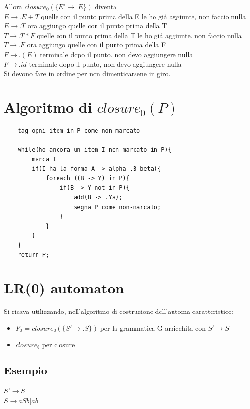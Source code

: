 Allora $closure_0(\{ E' \rightarrow .E \})$ diventa \\
$E \rightarrow .E + T $ quelle con il punto prima della E le ho gi\'a aggiunte, non faccio nulla\\
$E \rightarrow .T $ ora aggiungo quelle con il punto prima della T\\
$T \rightarrow .T * F $ quelle con il punto prima della T le ho gi\'a aggiunte, non faccio nulla\\
$T \rightarrow .F $ ora aggiungo quelle con il punto prima della F\\
$F \rightarrow .(E)$ terminale dopo il punto, non devo aggiungere nulla\\
$F \rightarrow .id$ terminale dopo il punto, non devo aggiungere nulla\\
Si devono fare in ordine per non dimenticarsene in giro.

\section{Algoritmo di $closure_0(P)$}
\begin{lstlisting}
	tag ogni item in P come non-marcato

	while(ho ancora un item I non marcato in P){
		marca I;
		if(I ha la forma A -> alpha .B beta){
			foreach ((B -> Y) in P){
				if(B -> Y not in P){
					add(B -> .Ya);
					segna P come non-marcato;
				}
			}
		}
	}
	return P;
\end{lstlisting}

\section{LR(0) automaton}
Si ricava utilizzando, nell'algoritmo di costruzione dell'automa caratteristico:
\begin{itemize}
	\item $P_0 = closure_0 ( \{ S' \rightarrow .S \} )$ per la grammatica G arricchita con $S' \rightarrow S$\\
	\item $ closure_0 $ per closure\\
\end{itemize}

\subsection{Esempio}
$ S' \rightarrow S $\\
$ S \rightarrow aSb | ab $\\

